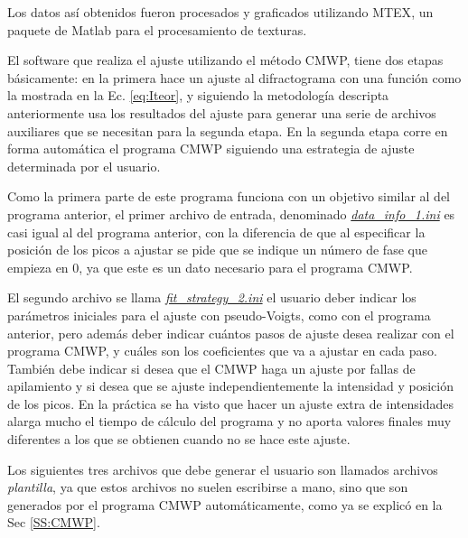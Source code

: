 Los datos así obtenidos fueron procesados y graficados utilizando MTEX\cite{Hielscher2008}, un paquete de Matlab para el procesamiento de texturas.

El software que realiza el ajuste utilizando el método CMWP, tiene dos etapas básicamente: en la primera hace un ajuste al difractograma con una función como la mostrada en la Ec. \ref{eq:Iteor}, y siguiendo la metodología descripta anteriormente usa los resultados del ajuste para generar una serie de archivos auxiliares que se necesitan para la segunda etapa.
En la segunda etapa corre en forma automática el programa CMWP siguiendo una estrategia de ajuste determinada por el usuario.

Como la primera parte de este programa funciona con un objetivo similar al del programa anterior, el primer archivo de entrada, denominado \hyperlink{dinfoCMWP}{\textit{data\_info\_1.ini}} es casi igual al del programa anterior, con la diferencia de que al especificar la posición de los picos a ajustar se pide que se indique un número de fase que empieza en 0, ya que este es un dato necesario para el programa CMWP.

El segundo archivo se llama \hyperlink{fitstrategy}{\textit{fit\_strategy\_2.ini}} el usuario deber indicar los parámetros iniciales para el ajuste con pseudo-Voigts, como con el programa anterior, pero además deber indicar cuántos pasos de ajuste desea realizar con el programa CMWP, y cuáles son los coeficientes que va a ajustar en cada paso.
También debe indicar si desea que el CMWP haga un ajuste por fallas de apilamiento  y si desea que se ajuste independientemente la intensidad y posición de los picos.
En la práctica se ha visto que hacer un ajuste extra de intensidades alarga mucho el tiempo de cálculo del programa y no aporta valores finales muy diferentes a los que se obtienen cuando no se hace este ajuste.

Los siguientes tres archivos que debe generar el usuario son llamados archivos \textit{plantilla}, ya que estos archivos no suelen escribirse a mano, sino que son generados por el programa CMWP automáticamente, como ya se explicó en la Sec \ref{SS:CMWP}.


\iffalse
